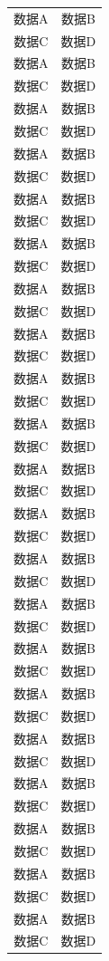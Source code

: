\documentclass{ctexart}
\begin{document}
\begin{mainmatter}
\begin{longtable}{@{}cc@{}}
			数据A & 数据B \\
			数据C & 数据D \\
			数据A & 数据B \\
			数据C & 数据D \\
			数据A & 数据B \\
			数据C & 数据D \\
			数据A & 数据B \\
			数据C & 数据D \\
			数据A & 数据B \\
			数据C & 数据D \\
			数据A & 数据B \\
			数据C & 数据D \\
			数据A & 数据B \\
			数据C & 数据D \\
			数据A & 数据B \\
			数据C & 数据D \\
			数据A & 数据B \\
			数据C & 数据D \\
			数据A & 数据B \\
			数据C & 数据D \\
			数据A & 数据B \\
			数据C & 数据D \\
			数据A & 数据B \\
			数据C & 数据D \\
			数据A & 数据B \\
			数据C & 数据D \\
			数据A & 数据B \\
			数据C & 数据D \\
			数据A & 数据B \\
			数据C & 数据D \\
			数据A & 数据B \\
			数据C & 数据D \\
			数据A & 数据B \\
			数据C & 数据D \\
			数据A & 数据B \\
			数据C & 数据D \\
			数据A & 数据B \\
			数据C & 数据D \\
			数据A & 数据B \\
			数据C & 数据D \\
			数据A & 数据B \\
			数据C & 数据D \\
			
		\end{longtable}
		

\end{mainmatter}
\end{document}
